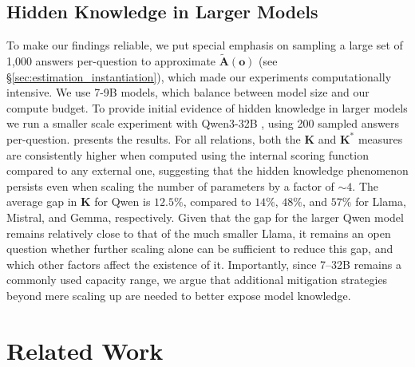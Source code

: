  

\subsection{Hidden Knowledge in Larger Models}
\label{sec:qwen}


To make our findings reliable, we put special emphasis on sampling a large set of 1,000 answers per-question to approximate $\mathbf{\tilde{A}(o)}$ (see \S \ref{sec:estimation_instantiation}), which made our experiments computationally intensive. We use 7-9B models, which balance between model size and our compute budget. To provide initial evidence of hidden knowledge in larger models we run a smaller scale experiment with \textsf{Qwen3-32B} \citep{yang2025qwen3}, using 200 sampled answers per-question.  presents the results. 
For all relations, both the $\mathbf{K}$ and $\mathbf{K}^\ast$ measures are consistently higher when computed using the internal scoring function compared to any external one, suggesting that the hidden knowledge phenomenon persists even when scaling the number of parameters by a factor of $\sim\!\!4$.
The average gap in $\mathbf{K}$ for \textsf{Qwen} is $12.5\%$, compared to $14\%$, $48\%$, and $57\%$ for \textsf{Llama}, \textsf{Mistral}, and \textsf{Gemma}, respectively.
Given that the gap for the larger \textsf{Qwen} model remains relatively close to that of the much smaller \textsf{Llama}, it remains an open question whether further scaling alone can be sufficient to reduce this gap, and which other factors affect the existence of it. Importantly, since 7–32B remains a commonly used capacity range, we argue that additional mitigation strategies beyond mere scaling up are needed to better expose model knowledge.


\vspace{-2pt}
\section{Related Work}
\label{sec:related}
\vspace{-5pt}


